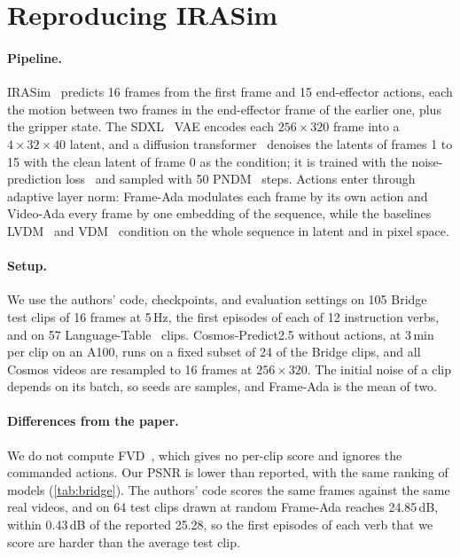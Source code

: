 \section{Reproducing IRASim}
\label{sec:reproduce}

\paragraph{Pipeline.}
IRASim~\cite{zhu2024irasim} predicts 16 frames from the first frame and 15 end-effector actions, each the motion between two frames in the end-effector frame of the earlier one, plus the gripper state.
The SDXL~\cite{podell2023sdxl} VAE encodes each $256\times320$ frame into a $4\times32\times40$ latent, and a diffusion transformer~\cite{peebles2023dit} denoises the latents of frames 1 to 15 with the clean latent of frame 0 as the condition; it is trained with the noise-prediction loss~\cite{ho2020ddpm} and sampled with 50 PNDM~\cite{liu2022pndm} steps.
Actions enter through adaptive layer norm: Frame-Ada modulates each frame by its own action and Video-Ada every frame by one embedding of the sequence, while the baselines LVDM~\cite{he2022lvdm} and VDM~\cite{ho2022vdm} condition on the whole sequence in latent and in pixel space.

\paragraph{Setup.}
We use the authors' code, checkpoints, and evaluation settings on 105 Bridge~\cite{walke2023bridgedata} test clips of 16 frames at 5\,Hz, the first episodes of each of 12 instruction verbs, and on 57 Language-Table~\cite{lynch2022interactive} clips.
Cosmos-Predict2.5 without actions, at 3\,min per clip on an A100, runs on a fixed subset of 24 of the Bridge clips, and all Cosmos videos are resampled to 16 frames at $256\times320$.
The initial noise of a clip depends on its batch, so seeds are samples, and Frame-Ada is the mean of two.

\paragraph{Differences from the paper.}
We do not compute FVD~\cite{unterthiner2018fvd}, which gives no per-clip score and ignores the commanded actions.
Our PSNR is lower than reported, with the same ranking of models (\cref{tab:bridge}).
The authors' code scores the same frames against the same real videos, and on 64 test clips drawn at random Frame-Ada reaches 24.85\,dB, within 0.43\,dB of the reported 25.28, so the first episodes of each verb that we score are harder than the average test clip.

